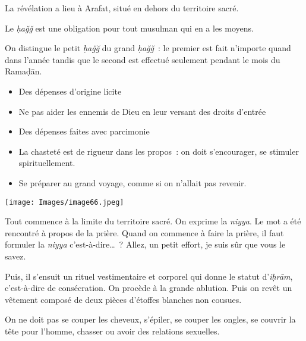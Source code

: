 La révélation a lieu à Arafat, situé en dehors du territoire sacré.

Le \emph{ḥaǧǧ} est une obligation pour tout musulman qui en a les
moyens.

On distingue le petit \emph{ḥağğ} du grand \emph{ḥağğ}~: le premier est
fait n'importe quand dans l'année tandis que le second est effectué
seulement pendant le mois du Ramaḍān.


\begin{itemize}
\item
  Des dépenses d'origine licite
\item
  Ne pas aider les ennemis de Dieu en leur versant des droits d'entrée
\item
  Des dépenses faites avec parcimonie
\item
  La chasteté est de rigueur dans les propos~: on doit s'encourager, se
  stimuler spirituellement.
\item
  Se préparer au grand voyage, comme si on n'allait pas revenir.
\end{itemize}


\texttt{[image: Images/image66.jpeg]}

Tout commence à la limite du territoire sacré. On exprime la
\emph{niyya}. Le mot a été rencontré à propos de la prière. Quand on
commence à faire la prière, il faut formuler la \emph{niyya}
c'est-à-dire\ldots~? Allez, un petit effort, je suis sûr que vous le
savez.

Puis, il s'ensuit un rituel vestimentaire et corporel qui donne le
statut d'\emph{iḥrām}, c'est-à-dire de consécration. On procède à la
grande ablution. Puis on revêt un vêtement composé de deux pièces
d'étoffes blanches non cousues.

On ne doit pas se couper les cheveux, s'épiler, se couper les ongles, se
couvrir la tête pour l'homme, chasser ou avoir des relations sexuelles.

